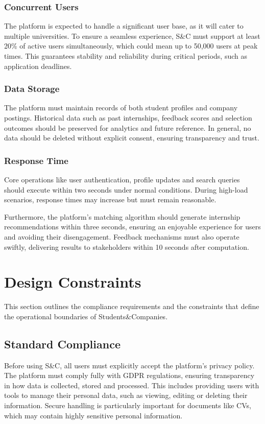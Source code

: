 \subsubsection{Concurrent Users}
The platform is expected to handle a significant user base, as it will cater to multiple universities.
To ensure a seamless experience, S\&C must support at least 20\% of active users simultaneously, which could mean up to 50,000 users at peak times.
This guarantees stability and reliability during critical periods, such as application deadlines.

\subsubsection{Data Storage}
The platform must maintain records of both student profiles and company postings.
Historical data such as past internships, feedback scores and selection outcomes should be preserved for analytics and future reference.
In general, no data should be deleted without explicit consent, ensuring transparency and trust.

\subsubsection{Response Time}
Core operations like user authentication, profile updates and search queries should execute within two seconds under normal conditions.
During high-load scenarios, response times may increase but must remain reasonable.

Furthermore, the platform's matching algorithm should generate internship recommendations within three seconds, ensuring an enjoyable experience for users and avoiding their disengagement.
Feedback mechanisms must also operate swiftly, delivering results to stakeholders within 10 seconds after computation.

\section{Design Constraints}
This section outlines the compliance requirements and the constraints that define the operational boundaries of Students\&Companies.

\subsection{Standard Compliance}
Before using S\&C, all users must explicitly accept the platform's privacy policy.
The platform must comply fully with GDPR regulations, ensuring transparency in how data is collected, stored and processed.
This includes providing users with tools to manage their personal data, such as viewing, editing or deleting their information.
Secure handling is particularly important for documents like CVs, which may contain highly sensitive personal information.

